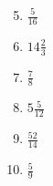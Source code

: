 \documentclass[12pt]{article}
\begin{document}
\begin{multicols}{2}
\begin{enumerate}
\setcounter{enumi}{4}

\item \hspace{0.25in} $\frac{5}{16}$ 
  \vspace{0.25in}

\item \hspace{0.25in} $14\frac{2}{3}$ 
  \vspace{0.25in}

\item \hspace{0.25in} $\frac{7}{8}$ 
  \vspace{0.25in}

\item \hspace{0.25in} $5\frac{5}{12}$ 
  \vspace{0.25in}

\item \hspace{0.25in} $\frac{52}{14}$ 
  \vspace{0.25in}
  
  \item \hspace{0.25in} $\frac{5}{9}$ 
  \vspace{0.25in}
  
\end{enumerate}
\end{multicols}
  \vspace{0.25in}
\end{document}
